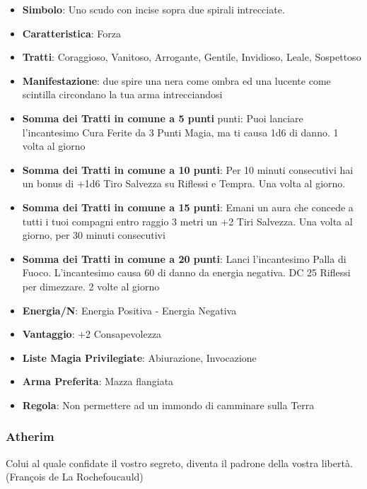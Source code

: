\begin{multicols}{2}
\begin{itemize}[leftmargin=*] \setlength{\itemsep}{0pt}
\item \textbf{Simbolo}: Uno scudo con incise sopra due spirali intrecciate.
\item \textbf{Caratteristica}: Forza
\item \textbf{Tratti}: Coraggioso, Vanitoso, Arrogante, Gentile, Invidioso, Leale, Sospettoso
\item \textbf{Manifestazione}: due spire una nera come ombra ed una lucente come scintilla circondano la tua arma intrecciandosi
\item \textbf{Somma dei Tratti in comune a 5 punti} punti: Puoi lanciare l'incantesimo Cura Ferite da 3 Punti Magia, ma ti causa 1d6 di danno. 1 volta al giorno
\item \textbf{Somma dei Tratti in comune a 10 punti}: Per 10 minuti consecutivi hai un bonus di +1d6 Tiro Salvezza su Riflessi e Tempra. Una volta al giorno.
\item \textbf{Somma dei Tratti in comune a 15 punti}: Emani un aura che concede a tutti i tuoi compagni entro raggio 3 metri un +2 Tiri Salvezza. Una volta al giorno, per 30 minuti consecutivi
\item \textbf{Somma dei Tratti in comune a 20 punti}: Lanci l'incantesimo Palla di Fuoco. L'incantesimo causa 60 di danno da energia negativa. DC 25 Riflessi per dimezzare. 2 volte al giorno
\item \textbf{Energia/N}: Energia Positiva - Energia Negativa
\item \textbf{Vantaggio}: +2 Consapevolezza
\item \textbf{Liste Magia Privilegiate}: Abiurazione, Invocazione
\item \textbf{Arma Preferita}: Mazza flangiata
\item \textbf{Regola}: Non permettere ad un immondo di camminare sulla Terra
\end{itemize}

\subsubsection{Atherim}\label{atherim}\hypertarget{atherim}{}

\begin{enfasi}{
Colui al quale confidate il vostro segreto, diventa il padrone della vostra libertà. (François de La Rochefoucauld)

\medskip

}
\end{enfasi}
\end{multicols}

